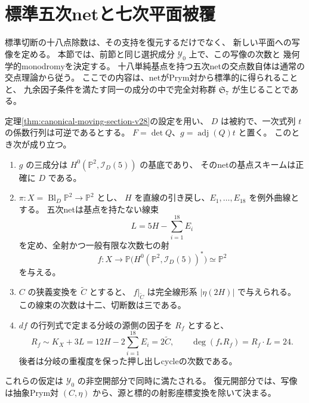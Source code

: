 \section{標準五次netと七次平面被覆}
\label{sec:canonical-septic-cover-v29}

標準切断の十八点除数は、その支持を復元するだけでなく、
新しい平面への写像を定める。
本節では、前節と同じ選択成分 $\mathcal Y_0$ 上で、この写像の次数と
幾何学的monodromyを決定する。
十八単純基点を持つ五次netの交点数自体は通常の交点理論から従う。
ここでの内容は、netがPrym対から標準的に得られることと、
九余因子条件を満たす同一の成分の中で完全対称群 $\mathfrak S_7$ が生じることである。

\begin{theorem}[標準五次netによる次数七写像]
\label{thm:canonical-septic-cover-v29}
定理\ref{thm:canonical-moving-section-v28}の設定を用い、
$D$ は被約で、一次式列 $t$ の係数行列は可逆であるとする。
$F=\det Q$、$g=\operatorname{adj}(Q)t$ と置く。
このとき次が成り立つ。
\begin{enumerate}
 \item $g$ の三成分は $H^0(\mathbb P^2,\mathcal I_D(5))$ の基底であり、
 そのnetの基点スキームは正確に $D$ である。
 \item $\pi:X=\operatorname{Bl}_{D}\mathbb P^2\to\mathbb P^2$ とし、
 $H$ を直線の引き戻し、$E_1,\ldots,E_{18}$ を例外曲線とする。
 五次netは基点を持たない線束
 \[
  L=5H-\sum_{i=1}^{18}E_i
 \]
 を定め、全射かつ一般有限な次数七の射
 \begin{equation}\label{eq:septic-morphism-v29}
  f:X\longrightarrow
  \mathbb P\bigl(H^0(\mathbb P^2,\mathcal I_D(5))^*\bigr)
  \simeq\mathbb P^2
 \end{equation}
 を与える。
 \item $C$ の狭義変換を $\widetilde C$ とすると、
 $f|_{\widetilde C}$ は完全線形系 $|\eta(2H)|$ で与えられる。
 この線束の次数は十二、切断数は三である。
 \item $df$ の行列式で定まる分岐の源側の因子を $R_f$ とすると、
 \begin{equation}\label{eq:septic-ramification-class-v29}
  R_f\sim K_X+3L
      =12H-2\sum_{i=1}^{18}E_i
      =2\widetilde C,
  \qquad \deg(f_*R_f)=R_f\cdot L=24.
 \end{equation}
 後者は分岐の重複度を保った押し出しcycleの次数である。
\end{enumerate}
これらの仮定は $\mathcal Y_0$ の非空開部分で同時に満たされる。
復元開部分では、写像は抽象Prym対 $(C,\eta)$ から、源と標的の射影座標変換を除いて決まる。
\end{theorem}

